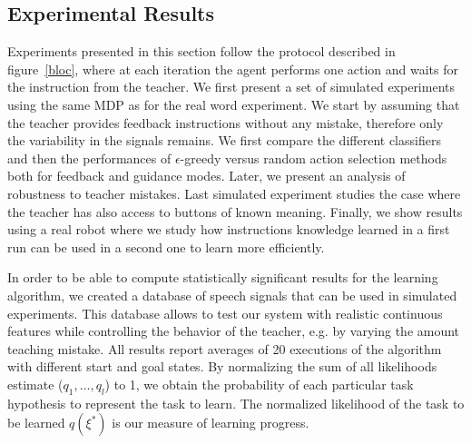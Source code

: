 \subsection{Experimental Results}
\label{sec:ExperimentalResults}
%
Experiments presented in this section follow the protocol described in figure~\ref{bloc}, where at each iteration the agent performs one action and waits for the instruction from the teacher. We first present a set of simulated experiments using the same MDP as for the real word experiment. We start by assuming that the teacher provides feedback instructions without any mistake, therefore only the variability in the signals remains. We first compare the different classifiers and then the performances of $\epsilon$-greedy versus random action selection methods both for feedback and guidance modes. Later, we present an analysis of robustness to teacher mistakes. Last simulated experiment studies the case where the teacher has also access to buttons of known meaning. Finally, we show results using a real robot where we study how instructions knowledge learned in a first run can be used in a second one to learn more efficiently.

%
In order to be able to compute statistically significant results for the learning algorithm, we created a database of speech signals that can be used in simulated experiments. This database allows to test our system with realistic continuous features while controlling the behavior of the teacher, e.g. by varying the amount teaching mistake. All results report averages of 20 executions of the algorithm with different start and goal states. By normalizing the sum of all likelihoods estimate ($q_1,\ldots,q_l$) to 1, we obtain the probability of each particular task hypothesis to represent the task to learn. The normalized likelihood of the task to be learned $q(\xi^*)$ is our measure of learning progress.
%
